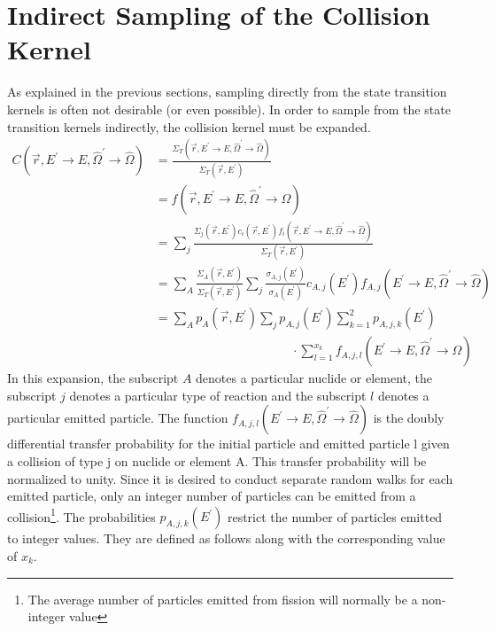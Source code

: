 \section{Indirect Sampling of the Collision Kernel}
As explained in the previous sections, sampling directly from the state
transition kernels is often not desirable (or even possible). In order to 
sample from the state transition kernels indirectly, the collision kernel 
must be expanded. 
\begin{align}
  C(\vec{r},E^{'} \to E, \hat{\Omega}^{'} \to \hat{\Omega}) & =
  \frac{\Sigma_T(\vec{r},E^{'} \to E,\hat{\Omega}^{'} \to \hat{\Omega})}
       {\Sigma_T(\vec{r},E^{'})} \nonumber \\
  & = f(\vec{r},E^{'} \to E,\hat{\Omega}^{'} \to \hat{\Omega}) \nonumber \\
  & = \sum_j \frac{\Sigma_j(\vec{r},E^{'})c_i(\vec{r},E^{'})
            f_i(\vec{r},E^{'} \to E,\hat{\Omega}^{'} \to \hat{\Omega})}
           {\Sigma_T(\vec{r},E^{'})} \nonumber \\
  & = \sum_A \frac{\Sigma_A(\vec{r},E^{'})}{\Sigma_T(\vec{r},E^{'})}
      \sum_j \frac{\sigma_{A,j}(E^{'})}{\sigma_A(E^{'})} c_{A,j}(E^{'})
      f_{A,j}(E^{'} \to E,\hat{\Omega}^{'} \to \hat{\Omega}) \nonumber \\
  & = \sum_A p_A(\vec{r},E^{'}) \sum_j p_{A,j}(E^{'}) 
      \sum_{k=1}^2 p_{A,j,k}(E^{'}) \nonumber \\
  & \qquad \qquad \qquad \qquad \qquad \quad
      \cdot \sum_{l=1}^{x_k} 
      f_{A,j,l}(E^{'} \to E,\hat{\Omega}^{'} \to \hat{\Omega})
  \label{eq:fully_expanded_collision_kernel}
\end{align}
In this expansion, the subscript $A$ denotes a particular nuclide or element, 
the subscript $j$ denotes a particular type of reaction and the subscript $l$ 
denotes a particular emitted particle. The function 
$f_{A,j,l}(E^{'} \to E,\hat{\Omega}^{'} \to \hat{\Omega})$ is the doubly
differential transfer probability for the initial particle and emitted
particle l given a collision of type j on nuclide or element A. This transfer 
probability will be normalized to unity. Since it is desired to conduct 
separate random walks for each emitted particle, only an integer number of 
particles can be emitted from a collision\footnote{The average number of 
particles emitted from fission will normally be a non-integer value}. The 
probabilities $p_{A,j,k}(E^{'})$ restrict the number of particles emitted to 
integer values. They are defined as follows along with the corresponding value 
of $x_k$.
